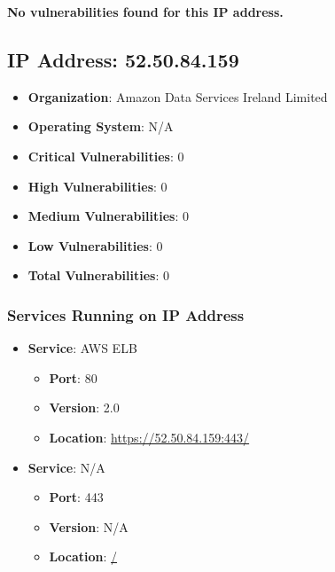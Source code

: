 \documentclass{article}
\begin{document}
\textbf{No vulnerabilities found for this IP address.}




\clearpage



\subsection*{IP Address: 52.50.84.159}

\begin{itemize}
    \item \textbf{Organization}: Amazon Data Services Ireland Limited
    \item \textbf{Operating System}:  N/A 
    \item \textbf{Critical Vulnerabilities}: 0
    \item \textbf{High Vulnerabilities}: 0
    \item \textbf{Medium Vulnerabilities}: 0
    \item \textbf{Low Vulnerabilities}: 0
    \item \textbf{Total Vulnerabilities}: 0
\end{itemize}

\subsubsection*{Services Running on IP Address}

\begin{itemize}
    
        \item \textbf{Service}: AWS ELB
        \begin{itemize}
            \item \textbf{Port}: 80
            \item \textbf{Version}:  2.0 
            \item \textbf{Location}: \href{ https://52.50.84.159:443/ }{ https://52.50.84.159:443/ }
        \end{itemize}
    
        \item \textbf{Service}: N/A
        \begin{itemize}
            \item \textbf{Port}: 443
            \item \textbf{Version}:  N/A 
            \item \textbf{Location}: \href{ / }{ / }
        \end{itemize}
    
\end{itemize}
\end{document}
